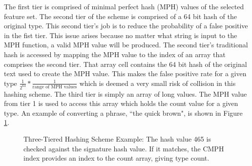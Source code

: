 		The first tier is comprised of minimal perfect hash (MPH) values of the selected feature set.  The second tier of the scheme is comprised of a 64 bit hash of the original type.  This second tier's job is to reduce the probability of a false positive in the fist tier.  This issue arises because no matter what string is input to the MPH function, a valid MPH value will be produced.  The second tier's traditional hash is accessed by mapping the MPH value to the index of an array that comprises the second tier.  That array cell contains the 64 bit hash of the original text used to create the MPH value.  This makes the false positive rate for a given type $\frac{1}{2^{64}} * \frac{1}{\text{range of MPH values}}$ which is deemed a very small risk of collision in this hashing scheme.  The third tier is simply an array of long values.  The MPH value from tier 1 is used to access this array which holds the count value for a given type.  An example of converting a phrase, ``the quick brown", is shown in Figure \ref{fig:3tierHashExample}. 
		
		\begin{figure}[ht!]
			\begin{center}
				\caption{Three-Tiered Hashing Scheme Example: The hash value 465 is checked against the signature hash value.  If it matches, the CMPH index provides an index to the count array, giving type count.}
				\label{fig:3tierHashExample}
			\end{center}
		\end{figure}
		
